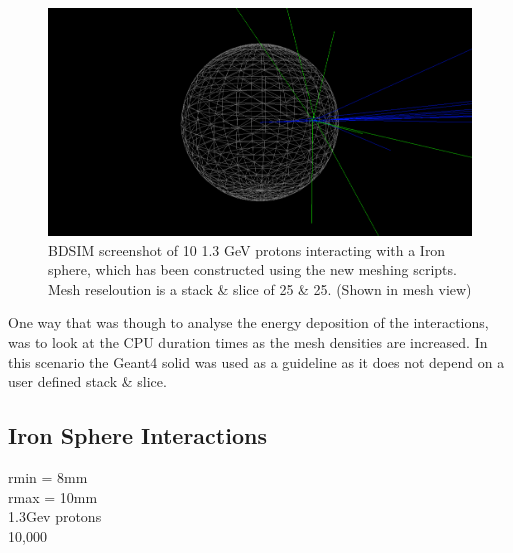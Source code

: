 \documentclass[12pt,a4paper]{article}
\begin{document}
\begin{figure}[h!]
\centering
\includegraphics[scale=0.35]{Images//BDSIM//ProtonSphere2.png}
\caption[width=\columnwidth]{BDSIM screenshot of 10 1.3 GeV protons interacting with a Iron sphere, which has been constructed using the new meshing scripts. Mesh reseloution is a stack \& slice of 25 \& 25. (Shown in mesh view)}
\label{sphbd}
\end{figure}

\noindent One way that was though to analyse the energy deposition of the interactions, was to look at the CPU duration times as the mesh densities are increased. In this scenario the Geant4 solid was used as a guideline as it does not depend on a user defined stack \& slice. 

\subsection{Iron Sphere Interactions}
rmin = 8mm\\
rmax = 10mm\\
1.3Gev protons\\
10,000\\
\end{document}

